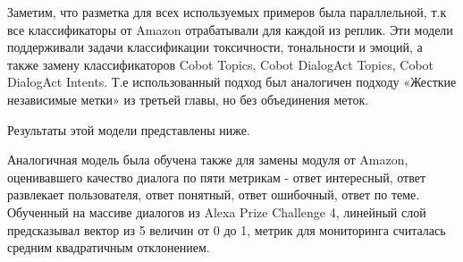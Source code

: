Заметим, что разметка для всех используемых примеров была параллельной, т.к все классификаторы от Amazon отрабатывали для каждой из реплик. Эти модели поддерживали задачи классификации токсичности, тональности и эмоций, а также замену классификаторов Cobot Topics, Cobot DialogAct Topics, Cobot DialogAct Intents. Т.е использованный подход был аналогичен подходу «Жесткие независимые метки» из третьей главы, но без объединения меток. 

Результаты этой модели представлены ниже.

\begin{table}[htbp]
    \caption{Точность (взвешенный-F1) для многозадачной классификации для различных моделей. Однозадачные модели означает оригинальные модели, 6 в 1 - многозадачную модель с одним линейным слоем, обученную на аннотациях всех упомянутых в таблице классификаторов, 3 в 1(кобот) - многозадачную модель с одним линейным слоем, обученную только на аннотациях классификаторов cobot topics, cobot dialogact topics и cobot dialogact intents, 3 в 1(не кобот) - многозадачную модель с одним линейным слоем, обученную только на аннотациях остальных классификаторов(классификаторы эмоций, тональности и токсичности).}
    \label{mtldream:1}
    \centering
\end{table}

Аналогичная модель была обучена также для замены модуля от Amazon, оценивавшего качество диалога по пяти метрикам - ответ интересный, ответ развлекает пользователя, ответ понятный, ответ ошибочный, ответ по теме. Обученный на массиве диалогов из Alexa Prize Challenge 4, линейный слой предсказывал вектор из 5 величин от 0 до 1, метрик для мониторинга считалась средним квадратичным отклонением.

